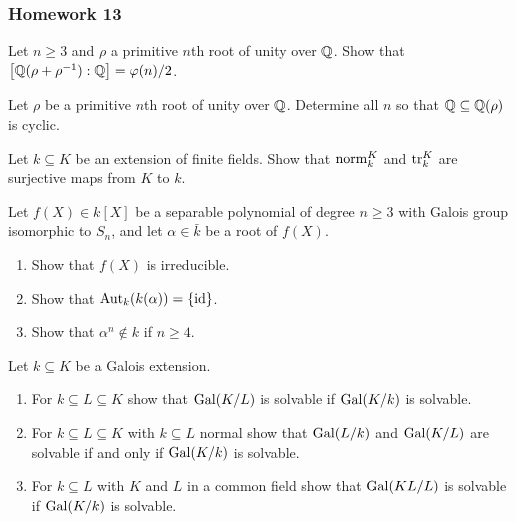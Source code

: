 \subsubsection{Homework 13}
\setcounter{exercise}{0}
\setcounter{equation}{0}

\begin{problem}
  Let \(n\geq 3\) and \(\rho\) a primitive \(n\)th root of unity over
  \(\mathbb{Q}\). Show that
  \(\bigl[\mathbb{Q}(\rho+\rho^{-1}):\mathbb{Q}\bigr]=\varphi(n)/2\).
\end{problem}
\begin{solution}
\end{solution}

\begin{problem}
  Let \(\rho\) be a primitive \(n\)th root of unity over
  \(\mathbb{Q}\). Determine all \(n\) so that \(\mathbb{Q}\subseteq\mathbb{Q}(\rho)\) is
  cyclic.
\end{problem}
\begin{solution}
\end{solution}

\begin{problem}
  Let \(k\subseteq K\) be an extension of finite fields. Show that
  \(\operatorname{norm}_k^K\) and \(\operatorname{tr}_k^K\) are surjective maps from \(K\) to \(k\).
\end{problem}
\begin{solution}
\end{solution}

\begin{problem}
  Let \(f(X)\in k[X]\) be a separable polynomial of degree \(n\geq 3\) with
  Galois group isomorphic to \(S_n\), and let \(\alpha\in\bar k\) be a root
  of \(f(X)\).
  \begin{enumerate}[label=(\alph*)]
  \item Show that \(f(X)\) is irreducible.
  \item Show that \(\operatorname{Aut}_k(k(\alpha))=\{\operatorname{id}\}\).
  \item Show that \(\alpha^n\notin k\) if \(n\geq 4\).
  \end{enumerate}
\end{problem}
\begin{solution}
\end{solution}

\begin{problem}
  Let \(k\subseteq K\) be a Galois extension.
\begin{enumerate}[label=(\alph*)]
\item For \(k\subseteq L\subseteq K\) show that \(\operatorname{Gal}(K/L)\) is solvable
  if \(\operatorname{Gal}(K/k)\) is solvable.
\item For \(k\subseteq L\subseteq K\) with \(k\subseteq L\) normal show
  that \(\operatorname{Gal}(L/k)\) and \(\operatorname{Gal}(K/L)\) are solvable if and only if
  \(\operatorname{Gal}(K/k)\) is solvable.
\item For \(k\subseteq L\) with \(K\) and \(L\) in a common field show that
  \(\operatorname{Gal}(KL/L)\) is solvable if \(\operatorname{Gal}(K/k)\) is solvable.
\end{enumerate}
\end{problem}
\begin{solution}
\end{solution}

